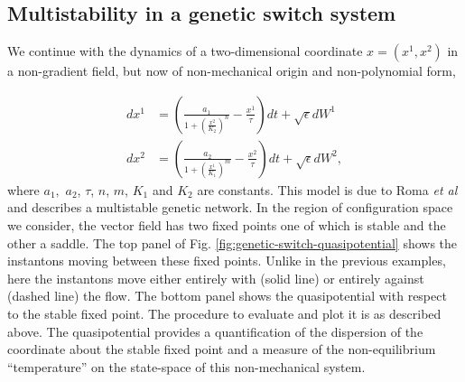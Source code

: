 \subsection{Multistability in a genetic switch system}

We continue with the dynamics of a two-dimensional coordinate $x=(x^{1},x^{2})$
in a non-gradient field, but now of non-mechanical origin and non-polynomial
form,

\begin{equation}
\begin{aligned}dx^{1} & =\left(\frac{a_{1}}{1+\left(\frac{x^{2}}{K_{2}}\right)^{n}}-\frac{x^{1}}{\tau}\right)dt+\sqrt{\epsilon}dW^{1}\\
dx^{2} & =\left(\frac{a_{2}}{1+\left(\frac{x^{1}}{K_{1}}\right)^{m}}-\frac{x^{2}}{\tau}\right)dt+\sqrt{\epsilon}dW^{2},
\end{aligned}
\label{eq:genetic-switch}
\end{equation}
where $a_{1},$ $a_{2}$, $\tau$, $n$, $m$, $K_{1}$ and $K_{2}$
are constants. This model is due to Roma \emph{et al} \citep{roma2005optimal}
and describes a multistable genetic network. In the region of configuration
space we consider, the vector field has two fixed points one of which
is stable and the other a saddle. The top panel of Fig. \ref{fig:genetic-switch-quasipotential}
shows the instantons moving between these fixed points. Unlike in
the previous examples, here the instantons move either entirely with
(solid line) or entirely against (dashed line) the flow. The bottom
panel shows the quasipotential with respect to the stable fixed point.
The procedure to evaluate and plot it is as described above. The quasipotential
provides a quantification of the dispersion of the coordinate about
the stable fixed point and a measure of the non-equilibrium ``temperature''
on the state-space of this non-mechanical system. 


